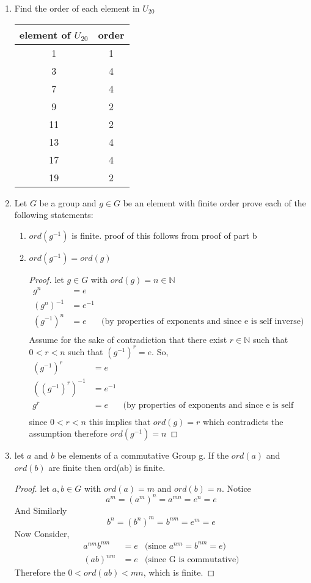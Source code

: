 \documentclass{article}
\newcommand{\N}{\mathbb{N}}
\begin{document}
\begin{enumerate}
		\item Find the order of each element in $U_{20}$
		\begin{center}
			\begin{tabular}{|c|c|}
				\hline element of $U_{20}$ & order \\ \hline\hline
				1 & 1  \\ \hline
				3 & 4  \\ \hline
				7 & 4  \\ \hline
				9 & 2  \\ \hline
				11 & 2 \\ \hline
				13 & 4 \\ \hline
				17 & 4 \\ \hline
				19 & 2 \\ \hline  
			\end{tabular}
		\end{center}
		\item Let $G$ be a group and $g \in G$ be an element with finite order prove each of the following statements: 
		\begin{enumerate}
			\item $ord(g^{-1})$ is finite. proof of this follows from proof of part b
			\item $ord(g^{-1}) = ord(g)$ 
			\begin{proof}
				let $g \in G$ with $ord(g) = n \in \N$  
				\begin{align*}
					g^n &= e \\
					(g^n)^{-1} &= e^{-1} \\
					(g^{-1})^n &= e &\text{(by properties of exponents and since e is self inverse)}\\
				\end{align*}
				Assume for the sake of contradiction that there exist $r \in \N$ such that $0 < r < n$ such that $(g^{-1})^r = e$.
				So, 
				\begin{align*}
					(g^{-1})^r &= e\\
					((g^{-1})^r)^{-1} &= e^{-1}\\
					g^r &= e &\text{(by properties of exponents and since e is self inverse)}\\
				\end{align*}
				since $0<r <n$ this implies that $ord(g)=r$ which contradicts the assumption therefore $ord(g^{-1})=n$
			\end{proof}
		\end{enumerate}
		\item let $a$ and $b$ be elements of a commutative Group g. If the $ord(a)$ and $ord(b)$ are finite then ord(ab) is finite.
		\begin{proof}
			let $a,b \in G$ with $ord(a) = m$ and $ord(b) = n$.
			Notice $$a^m = (a^{m})^n =a^{mn}= e^n = e$$ And Similarly $$b^n =(b^{n})^m = b^{nm} = e^m = e$$
			Now Consider,
			\begin{align*}
				a^{nm}b^{nm} &= e &\text{(since } a^{nm}=b^{nm}=e \text{)}\\
				(ab)^{nm} &= e  &\text{(since G is commutative)}
			\end{align*}
			Therefore the $0 < ord(ab) <mn$, which is finite. 
		\end{proof} 
	\end{enumerate}
\end{document}
